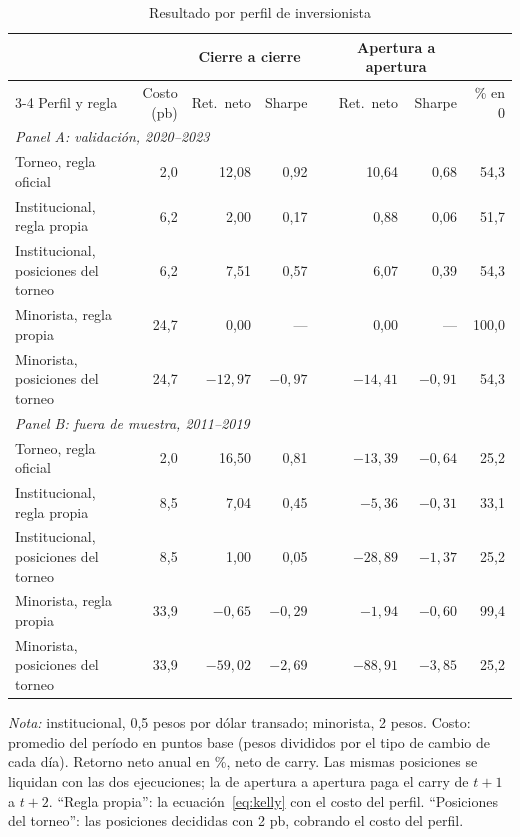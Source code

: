 \documentclass[11pt,a4paper]{article}
\begin{document}
\begin{table}[htbp]\centering\small
\caption{Resultado por perfil de inversionista}\label{tab:perfiles}
\begin{threeparttable}
\begin{tabular}{l r rr c rr r}
\toprule
 & & \multicolumn{2}{c}{Cierre a cierre} & & \multicolumn{2}{c}{Apertura a apertura} & \\
\cmidrule{3-4}\cmidrule{6-7}
Perfil y regla & Costo (pb) & Ret.\ neto & Sharpe & & Ret.\ neto & Sharpe & \% en 0 \\
\midrule
\multicolumn{8}{l}{\emph{Panel A: validación, 2020--2023}} \\
Torneo, regla oficial & 2,0 & 12,08 & 0,92 & & 10,64 & 0,68 & 54,3 \\
Institucional, regla propia & 6,2 & 2,00 & 0,17 & & 0,88 & 0,06 & 51,7 \\
Institucional, posiciones del torneo & 6,2 & 7,51 & 0,57 & & 6,07 & 0,39 & 54,3 \\
Minorista, regla propia & 24,7 & 0,00 & --- & & 0,00 & --- & 100,0 \\
Minorista, posiciones del torneo & 24,7 & $-12{,}97$ & $-0{,}97$ & & $-14{,}41$ & $-0{,}91$ & 54,3 \\
\midrule
\multicolumn{8}{l}{\emph{Panel B: fuera de muestra, 2011--2019}} \\
Torneo, regla oficial & 2,0 & 16,50 & 0,81 & & $-13{,}39$ & $-0{,}64$ & 25,2 \\
Institucional, regla propia & 8,5 & 7,04 & 0,45 & & $-5{,}36$ & $-0{,}31$ & 33,1 \\
Institucional, posiciones del torneo & 8,5 & 1,00 & 0,05 & & $-28{,}89$ & $-1{,}37$ & 25,2 \\
Minorista, regla propia & 33,9 & $-0{,}65$ & $-0{,}29$ & & $-1{,}94$ & $-0{,}60$ & 99,4 \\
Minorista, posiciones del torneo & 33,9 & $-59{,}02$ & $-2{,}69$ & & $-88{,}91$ & $-3{,}85$ & 25,2 \\
\bottomrule
\end{tabular}
\begin{tablenotes}\footnotesize
\item \emph{Nota:} institucional, 0,5 pesos por dólar transado; minorista, 2 pesos. Costo: promedio del período en puntos base (pesos divididos por el tipo de cambio de cada día). Retorno neto anual en \%, neto de carry. Las mismas posiciones se liquidan con las dos ejecuciones; la de apertura a apertura paga el carry de \(t+1\) a \(t+2\). ``Regla propia'': la ecuación~\eqref{eq:kelly} con el costo del perfil. ``Posiciones del torneo'': las posiciones decididas con 2 pb, cobrando el costo del perfil.
\end{tablenotes}
\end{threeparttable}
\end{table}
\end{document}
